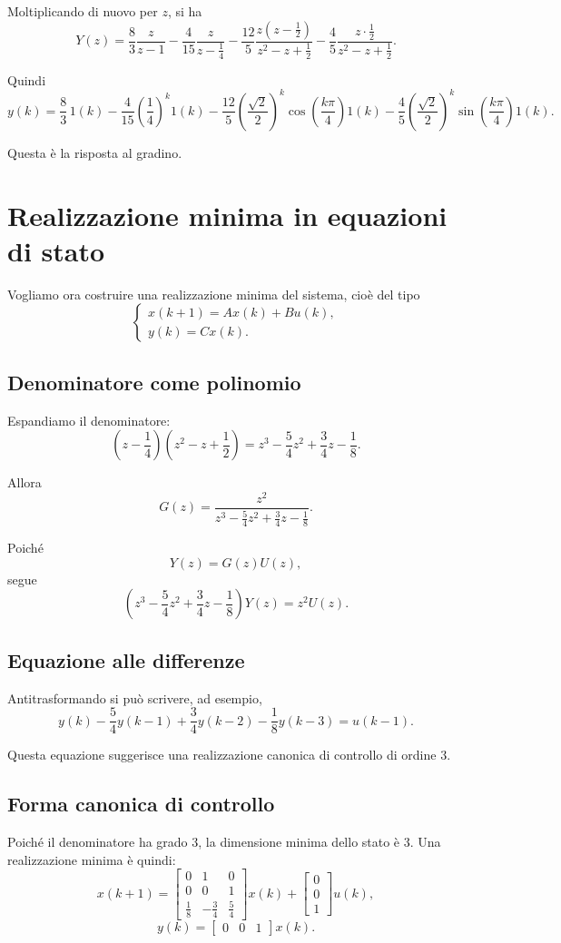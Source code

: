 Moltiplicando di nuovo per \(z\), si ha
\[
Y(z)
=
\frac{8}{3}\frac{z}{z-1}
-
\frac{4}{15}\frac{z}{z-\frac14}
-
\frac{12}{5}\frac{z\left(z-\frac12\right)}{z^2-z+\frac12}
-
\frac{4}{5}\frac{z\cdot \frac12}{z^2-z+\frac12}.
\]

Quindi
\[
y(k)
=
\frac{8}{3}\,1(k)
-
\frac{4}{15}\left(\frac14\right)^k 1(k)
-
\frac{12}{5}\left(\frac{\sqrt2}{2}\right)^k
\cos\!\left(\frac{k\pi}{4}\right)1(k)
-
\frac{4}{5}\left(\frac{\sqrt2}{2}\right)^k
\sin\!\left(\frac{k\pi}{4}\right)1(k).
\]

Questa è la risposta al gradino.

\section{Realizzazione minima in equazioni di stato}

Vogliamo ora costruire una realizzazione minima del sistema, cioè del tipo
\[
\begin{cases}
x(k+1)=Ax(k)+Bu(k),\\
y(k)=Cx(k).
\end{cases}
\]

\subsection{Denominatore come polinomio}

Espandiamo il denominatore:
\[
\left(z-\frac14\right)\left(z^2-z+\frac12\right)
=
z^3-\frac54 z^2+\frac34 z-\frac18.
\]

Allora
\[
G(z)=\frac{z^2}{z^3-\frac54 z^2+\frac34 z-\frac18}.
\]

Poiché
\[
Y(z)=G(z)U(z),
\]
segue
\[
\left(z^3-\frac54 z^2+\frac34 z-\frac18\right)Y(z)=z^2U(z).
\]

\subsection{Equazione alle differenze}

Antitrasformando si può scrivere, ad esempio,
\[
y(k)-\frac54 y(k-1)+\frac34 y(k-2)-\frac18 y(k-3)=u(k-1).
\]

Questa equazione suggerisce una realizzazione canonica di controllo di ordine \(3\).

\subsection{Forma canonica di controllo}

Poiché il denominatore ha grado \(3\), la dimensione minima dello stato è \(3\).  
Una realizzazione minima è quindi:
\[
x(k+1)=
\begin{bmatrix}
0 & 1 & 0\\
0 & 0 & 1\\
\frac18 & -\frac34 & \frac54
\end{bmatrix}x(k)
+
\begin{bmatrix}
0\\
0\\
1
\end{bmatrix}u(k),
\]
\[
y(k)=
\begin{bmatrix}
0 & 0 & 1
\end{bmatrix}x(k).
\]


